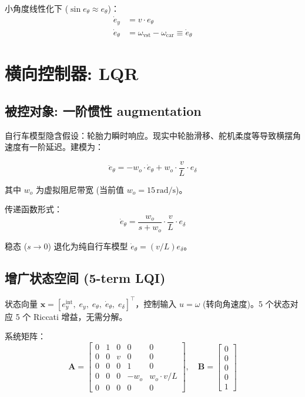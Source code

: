 \documentclass[11pt,a4paper]{article}
\begin{document}
小角度线性化下 ($\sin e_\theta \approx e_\theta$)：
\begin{align}
\dot{e}_y &= v \cdot e_\theta \label{eq:ey_dot}\\
\dot{e}_\theta &= \omega_{\text{vst}} - \omega_{\text{car}} \equiv \dot{e}_\theta
\end{align}

\section{横向控制器: LQR}

\subsection{被控对象: 一阶惯性 augmentation}

自行车模型隐含假设：轮胎力瞬时响应。现实中轮胎滑移、舵机柔度等导致横摆角速度有一阶延迟。建模为：

\begin{equation}
\ddot{e}_\theta = -w_o \cdot \dot{e}_\theta + w_o \cdot \frac{v}{L} \cdot e_\delta
\label{eq:ethd_dyn}
\end{equation}

其中 $w_o$ 为虚拟阻尼带宽 (当前值 $w_o = 15\,\text{rad/s}$)。

传递函数形式：
\begin{equation}
\dot{e}_\theta = \frac{w_o}{s + w_o} \cdot \frac{v}{L} \cdot e_\delta
\end{equation}

稳态 ($s \to 0$) 退化为纯自行车模型 $\dot{e}_\theta = (v/L)e_\delta$。

\subsection{增广状态空间 (5-term LQI)}

状态向量 $\mathbf{x} = [e_y^{\text{int}},\; e_y,\; e_\theta,\; \dot{e}_\theta,\; e_\delta]^\top$，控制输入 $u = \omega$ (转向角速度)。5 个状态对应 5 个 Riccati 增益，无需分解。

系统矩阵：
\begin{equation}
\mathbf{A} =
\begin{bmatrix}
0 & 1 & 0 & 0      & 0            \\
0 & 0 & v & 0      & 0            \\
0 & 0 & 0 & 1      & 0            \\
0 & 0 & 0 & -w_o   & w_o \cdot v/L \\
0 & 0 & 0 & 0      & 0
\end{bmatrix},
\quad
\mathbf{B} =
\begin{bmatrix}
0 \\ 0 \\ 0 \\ 0 \\ 1
\end{bmatrix}
\label{eq:AB}
\end{equation}
\end{document}
